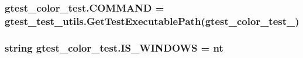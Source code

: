 \subsubsection[{\texorpdfstring{C\+O\+M\+M\+A\+ND}{COMMAND}}]{\setlength{\rightskip}{0pt plus 5cm}gtest\+\_\+color\+\_\+test.\+C\+O\+M\+M\+A\+ND = {\bf gtest\+\_\+test\+\_\+utils.\+Get\+Test\+Executable\+Path}(\textquotesingle{}gtest\+\_\+color\+\_\+test\+\_\+\textquotesingle{})}\hypertarget{namespacegtest__color__test_a5b2d1937052a86cc99b722dd0db8e4fc}{}\label{namespacegtest__color__test_a5b2d1937052a86cc99b722dd0db8e4fc}
\subsubsection[{\texorpdfstring{I\+S\+\_\+\+W\+I\+N\+D\+O\+WS}{IS_WINDOWS}}]{\setlength{\rightskip}{0pt plus 5cm}string gtest\+\_\+color\+\_\+test.\+I\+S\+\_\+\+W\+I\+N\+D\+O\+WS = \textquotesingle{}nt\textquotesingle{}}\hypertarget{namespacegtest__color__test_a0d4451a99f88105308f0842eb3ec2938}{}\label{namespacegtest__color__test_a0d4451a99f88105308f0842eb3ec2938}
